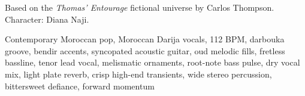 

\begin{notes}
Based on the \emph{Thomas’ Entourage} fictional universe by Carlos Thompson.\\
Character: Diana Naji.\\
\end{notes}

\begin{style}
Contemporary Moroccan pop, Moroccan Darija vocals, 112 BPM, darbouka groove, bendir accents, syncopated acoustic guitar, oud melodic fills, fretless bassline, tenor lead vocal, melismatic ornaments, root-note bass pulse, dry vocal mix, light plate reverb, crisp high-end transients, wide stereo percussion, bittersweet defiance, forward momentum
\end{style}

